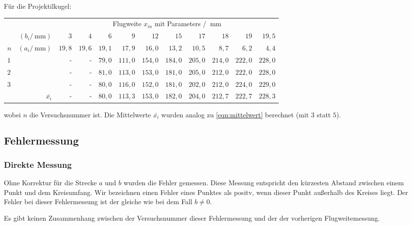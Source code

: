 \documentclass[twoside]{article}
\begin{document}
        Für die Projektilkugel:
        \begin{center}
            \begin{tabular}{l r rrrrrrrrrr}
                \toprule
                && \multicolumn{10}{c}{Flugweite $x_{in}$ mit Parameters / $\SI{}{\milli\meter}$}  \\
                \cmidrule{3-12} & $\left(b_i/\SI{}{\milli\meter}\right)$ & $3$ & $4$ & $6$ & $9$ & $12$ & $15$ & $17$ & $18$ & $19$ & $19,5$ \\
                $n$ & $\left(a_i/\SI{}{\milli\meter}\right)$ & $19,8$ & $19,6$ & $19,1$ & $17,9$ & $16,0$ & $13,2$ & $10,5$ & $8,7$ & $6,2$ & $4,4$ \\
                \midrule
                $1$ &  & - & - & $79,0$ & $111,0$ & $154,0$ & $184,0$ & $205,0$ & $214,0$ & $222,0$ & $228,0$ \\
                $2$ &  & - & - & $81,0$ & $113,0$ & $153,0$ & $181,0$ & $205,0$ & $212,0$ & $222,0$ & $228,0$ \\
                $3$ &  & - & - & $80,0$ & $116,0$ & $152,0$ & $181,0$ & $202,0$ & $212,0$ & $224,0$ & $229,0$ \\
                \midrule
                & $\bar{x_i}$ & - & - & $80,0$ & $113,3$ & $153,0$ & $182,0$ & $204,0$ & $212,7$ & $222,7$ & $228,3$ \\
                \bottomrule
            \end{tabular}
        \end{center}
        \vspace{0.5\baselineskip}
        wobei $n$ die Versuchsnummer ist. Die Mittelwerte $\bar{x_i}$ wurden analog zu \eqref{eqn:mittelwert} berechnet (mit $3$ statt $5$).

        \subsection{Fehlermessung}
            \subsubsection{Direkte Messung}
            Ohne Korrektur für die Strecke $a$ und $b$ wurden die Fehler gemessen. Diese Messung entspricht den kürzesten Abstand zwischen einem Punkt und dem Kreisumfang. Wir bezeichnen einen Fehler eines Punktes als positv, wenn dieser Punkt außerhalb des Kreises liegt. Der Fehler bei dieser Fehlermessung ist der gleiche wie bei dem Fall $b \neq 0$. 

            Es gibt keinen Zusammenhang zwischen der Versuchsnummer dieser Fehlermessung und der der vorherigen Flugweitemessung.
\end{document}
